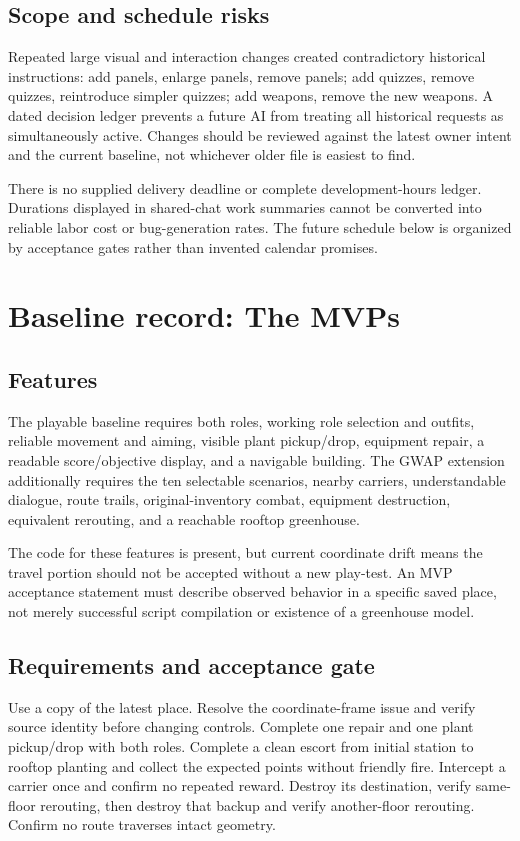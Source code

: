 \section{Scope and schedule risks}
Repeated large visual and interaction changes created contradictory historical instructions: add panels, enlarge panels, remove panels; add quizzes, remove quizzes, reintroduce simpler quizzes; add weapons, remove the new weapons.\allowbreak{} A dated decision ledger prevents a future AI from treating all historical requests as simultaneously active.\allowbreak{} Changes should be reviewed against the latest owner intent and the current baseline, not whichever older file is easiest to find.\allowbreak{}

There is no supplied delivery deadline or complete development-hours ledger.\allowbreak{} Durations displayed in shared-chat work summaries cannot be converted into reliable labor cost or bug-generation rates.\allowbreak{} The future schedule below is organized by acceptance gates rather than invented calendar promises.\allowbreak{}

\chapter{Baseline record: The MVPs}
\section{Features}
The playable baseline requires both roles, working role selection and outfits, reliable movement and aiming, visible plant pickup/\allowbreak{}drop, equipment repair, a readable score/\allowbreak{}objective display, and a navigable building.\allowbreak{} The GWAP extension additionally requires the ten selectable scenarios, nearby carriers, understandable dialogue, route trails, original-inventory combat, equipment destruction, equivalent rerouting, and a reachable rooftop greenhouse.\allowbreak{}

The code for these features is present, but current coordinate drift means the travel portion should not be accepted without a new play-test.\allowbreak{} An MVP acceptance statement must describe observed behavior in a specific saved place, not merely successful script compilation or existence of a greenhouse model.\allowbreak{}

\section{Requirements and acceptance gate}
Use a copy of the latest place.\allowbreak{} Resolve the coordinate-frame issue and verify source identity before changing controls.\allowbreak{} Complete one repair and one plant pickup/\allowbreak{}drop with both roles.\allowbreak{} Complete a clean escort from initial station to rooftop planting and collect the expected points without friendly fire.\allowbreak{} Intercept a carrier once and confirm no repeated reward.\allowbreak{} Destroy its destination, verify same-floor rerouting, then destroy that backup and verify another-floor rerouting.\allowbreak{} Confirm no route traverses intact geometry.\allowbreak{}

